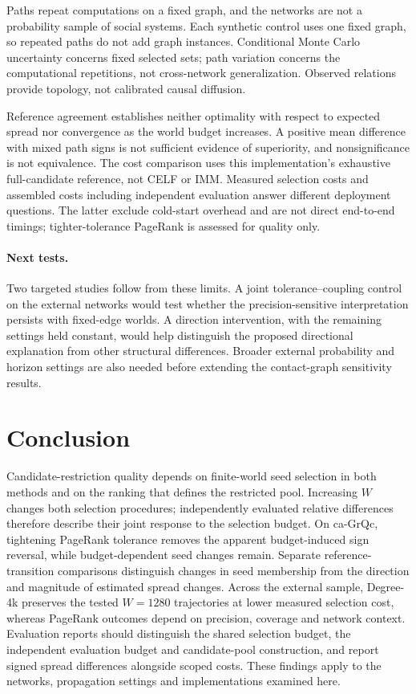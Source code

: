 \documentclass[smallextended]{svjour3}
\begin{document}
Paths repeat computations on a fixed graph, and the networks are not a probability sample of social systems. Each synthetic control uses one fixed graph, so repeated paths do not add graph instances. Conditional Monte Carlo uncertainty concerns fixed selected sets; path variation concerns the computational repetitions, not cross-network generalization. Observed relations provide topology, not calibrated causal diffusion.

Reference agreement establishes neither optimality with respect to expected spread nor convergence as the world budget increases. A positive mean difference with mixed path signs is not sufficient evidence of superiority, and nonsignificance is not equivalence. The cost comparison uses this implementation's exhaustive full-candidate reference, not CELF or IMM. Measured selection costs and assembled costs including independent evaluation answer different deployment questions. The latter exclude cold-start overhead and are not direct end-to-end timings; tighter-tolerance PageRank is assessed for quality only.

\paragraph{Next tests.} Two targeted studies follow from these limits. A joint tolerance--coupling control on the external networks would test whether the precision-sensitive interpretation persists with fixed-edge worlds. A direction intervention, with the remaining settings held constant, would help distinguish the proposed directional explanation from other structural differences. Broader external probability and horizon settings are also needed before extending the contact-graph sensitivity results.

\section{Conclusion}
Candidate-restriction quality depends on finite-world seed selection in both methods and on the ranking that defines the restricted pool. Increasing $W$ changes both selection procedures; independently evaluated relative differences therefore describe their joint response to the selection budget. On ca-GrQc, tightening PageRank tolerance removes the apparent budget-induced sign reversal, while budget-dependent seed changes remain. Separate reference-transition comparisons distinguish changes in seed membership from the direction and magnitude of estimated spread changes. Across the external sample, Degree-4k preserves the tested $W=1280$ trajectories at lower measured selection cost, whereas PageRank outcomes depend on precision, coverage and network context. Evaluation reports should distinguish the shared selection budget, the independent evaluation budget and candidate-pool construction, and report signed spread differences alongside scoped costs. These findings apply to the networks, propagation settings and implementations examined here.
\end{document}
